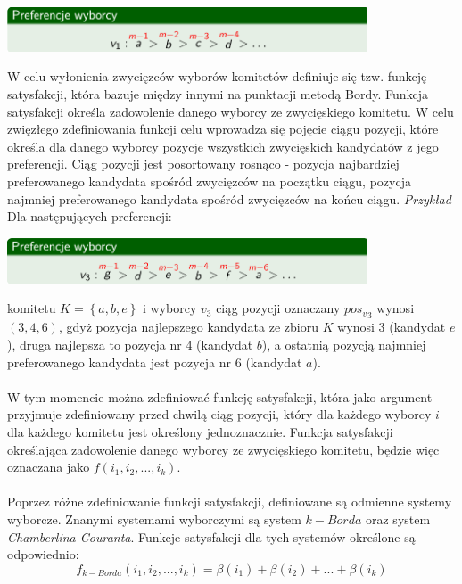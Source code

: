 \documentclass[polish,11pt]{aghthesis}
\begin{document}
\begin{center}
\includegraphics[width=0.8\textwidth]{pics/Borda_points.png}
\end{center}
W celu wyłonienia zwycięzców wyborów komitetów definiuje się tzw. funkcję satysfakcji,
która bazuje między innymi na punktacji metodą Bordy. Funkcja satysfakcji określa
zadowolenie danego wyborcy ze zwycięskiego komitetu. W celu zwięzłego zdefiniowania
funkcji celu wprowadza się pojęcie ciągu pozycji, które określa dla danego wyborcy pozycje
wszystkich zwycięskich kandydatów z jego preferencji. Ciąg pozycji jest posortowany
rosnąco - pozycja najbardziej preferowanego kandydata spośród zwycięzców na początku
ciągu, pozycja najmniej preferowanego kandydata spośród zwycięzców na końcu ciągu.
\clearpage
\noindent
\emph{Przykład} \\ 
Dla następujących preferencji:
\begin{center}
\includegraphics[width=0.8\textwidth]{pics/positions.png}
\end{center}
komitetu $K = \left\{a, b, e\right\}$ i wyborcy $v_3$ ciąg pozycji oznaczany ${pos_v}_3$ wynosi $(3,4,6)$, gdyż pozycja najlepszego kandydata ze zbioru $K$ wynosi $3$ (kandydat $e$), druga najlepsza to pozycja nr $4$ (kandydat $b$), a ostatnią pozycją najmniej preferowanego kandydata jest pozycja nr $6$ (kandydat $a$). \\ \\
W tym momencie można zdefiniować funkcję satysfakcji, która jako argument przyjmuje
zdefiniowany przed chwilą ciąg pozycji, który dla każdego wyborcy $i$ dla każdego komitetu
jest określony jednoznacznie. Funkcja satysfakcji określająca zadowolenie danego wyborcy
ze zwycięskiego komitetu, będzie więc oznaczana jako $f(i_1, i_2, ... , i_k)$. \\ \\
Poprzez różne zdefiniowanie funkcji satysfakcji, definiowane są odmienne systemy
wyborcze. Znanymi systemami wyborczymi są system $k-Borda$ oraz system
\textit{Chamberlina-Couranta}. Funkcje satysfakcji dla tych systemów określone są odpowiednio:
\begin{equation}
\label{eq:k_borda}
f_{k-Borda}(i_1, i_2, ..., i_k) = \beta(i_1) + \beta(i_2) + ... + \beta(i_k) 
\end{equation}
\end{document}
